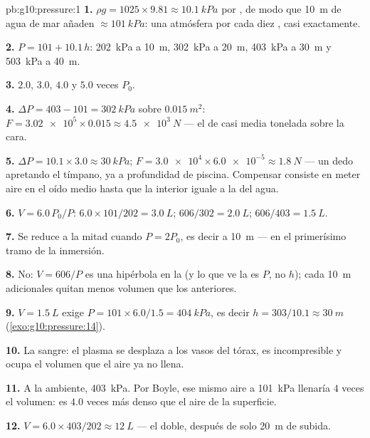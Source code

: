 \begin{solution}{pb:g10:pressure:1}
\textbf{1.} $\rho g = 1025 \times 9.81 \approx \qty{10.1}{kPa}$ por
, de modo que \qty{10}{m} de agua de mar añaden
$\approx \qty{101}{kPa}$: una atmósfera por cada diez , casi
exactamente.

\textbf{2.} $P = 101 + 10.1\,h$: \qty{202}{kPa} a \qty{10}{m},
\qty{302}{kPa} a \qty{20}{m}, \qty{403}{kPa} a \qty{30}{m} y
\qty{503}{kPa} a \qty{40}{m}.

\textbf{3.} $2.0$, $3.0$, $4.0$ y $5.0$ veces $P_0$.

\textbf{4.} $\Delta P = 403 - 101 = \qty{302}{kPa}$ sobre
$\qty{0.015}{m^2}$: $F = \num{3.02e5} \times 0.015 \approx
\qty{4.5e3}{N}$ --- el  de casi media tonelada sobre la cara.

\textbf{5.} $\Delta P = 10.1 \times 3.0 \approx \qty{30}{kPa}$;
$F = \num{3.0e4} \times \num{6.0e-5} \approx \qty{1.8}{N}$ --- un dedo
apretando el tímpano, ya a profundidad de piscina. Compensar consiste en
meter aire en el oído medio hasta que la  interior iguale a la
del agua.

\textbf{6.} $V = 6.0 \, P_0/P$: $6.0 \times 101/202 = \qty{3.0}{L}$;
$606/302 = \qty{2.0}{L}$; $606/403 = \qty{1.5}{L}$.

\textbf{7.} Se reduce a la mitad cuando $P = 2P_0$, es decir a
\qty{10}{m} --- en el primerísimo tramo de la inmersión.

\textbf{8.} No: $V = 606/P$ es una hipérbola en la  (y
lo que ve la  es $P$, no $h$); cada \qty{10}{m} adicionales
quitan menos volumen que los anteriores.

\textbf{9.} $V = \qty{1.5}{L}$ exige
$P = 101 \times 6.0/1.5 = \qty{404}{kPa}$, es decir
$h = 303/10.1 \approx \qty{30}{m}$ (\cref{exo:g10:pressure:14}).

\textbf{10.} La sangre: el plasma se desplaza a los vasos del tórax,
es incompresible y ocupa el volumen que el aire ya no llena.

\textbf{11.} A la  ambiente, \qty{403}{kPa}. Por Boyle, ese mismo
aire a \qty{101}{kPa} llenaría $4$ veces el volumen: es $4.0$ veces más
denso que el aire de la superficie.

\textbf{12.} $V = 6.0 \times 403/202 \approx \qty{12}{L}$ --- el doble,
después de solo \qty{20}{m} de subida.


\end{solution}
